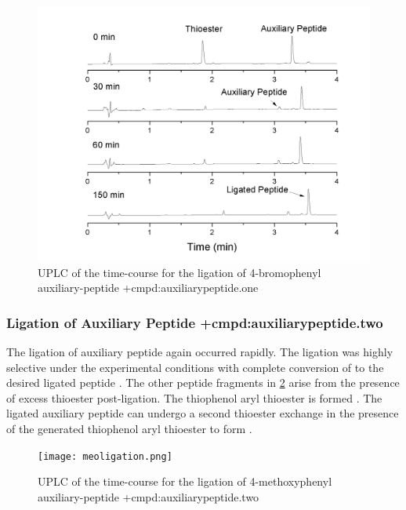     \begin{figure}[!htbp]
        \includegraphics[max width=\textwidth]{brligation.png}
        \caption{UPLC of the time-course for the ligation of 4-bromophenyl auxiliary-peptide \cmpd+{cmpd:auxiliarypeptide.one}}
        \label{fig:brligation}
    \end{figure}

    \subsubsection{Ligation of Auxiliary Peptide \cmpd+{cmpd:auxiliarypeptide.two}}

    The ligation of auxiliary peptide  again occurred rapidly. The ligation was highly selective under the experimental conditions with complete conversion of  to the desired ligated peptide . The other peptide fragments in \ref{fig:meoligationtime} arise from the presence of excess thioester  post-ligation. The thiophenol aryl thioester  is formed \insitu. The ligated auxiliary peptide  can undergo a second thioester exchange in the presence of the \insitu generated thiophenol aryl thioester  to form .

    \begin{figure}[!htpb]
        \texttt{[image: meoligation.png]}
        \caption{UPLC of the time-course for the ligation of 4-methoxyphenyl auxiliary-peptide \cmpd+{cmpd:auxiliarypeptide.two}}
        \label{fig:meoligationtime}
    \end{figure}

